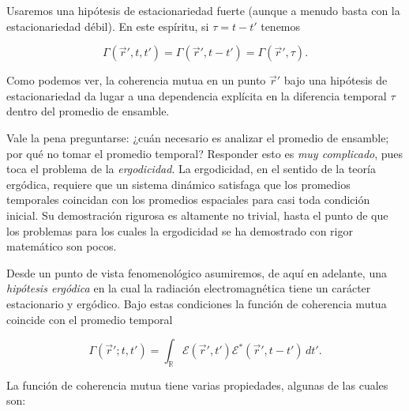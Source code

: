 	Usaremos una hipótesis de estacionariedad fuerte (aunque a menudo basta con la estacionariedad débil). En este espíritu, si $\tau = t-t'$ tenemos

	\begin{equation}
		\Gamma(\vec{r}',t,t') = \Gamma(\vec{r}',t-t') = \Gamma(\vec{r}',\tau).
	\end{equation}

	Como podemos ver, la coherencia mutua en un punto $\vec{r}'$ bajo una hipótesis de estacionariedad da lugar a una dependencia explícita en la diferencia temporal $\tau$ dentro del promedio de ensamble.

	Vale la pena preguntarse: ¿cuán necesario es analizar el promedio de ensamble; por qué no tomar el promedio temporal? Responder esto es \textit{muy complicado}, pues toca el problema de la \textit{ergodicidad}. La ergodicidad, en el sentido de la teoría ergódica, requiere que un sistema dinámico satisfaga que los promedios temporales coincidan con los promedios espaciales para casi toda condición inicial. Su demostración rigurosa es altamente no trivial, hasta el punto de que los problemas para los cuales la ergodicidad se ha demostrado con rigor matemático son pocos.

	Desde un punto de vista fenomenológico asumiremos, de aquí en adelante, una \textit{hipótesis ergódica} en la cual la radiación electromagnética tiene un carácter estacionario y ergódico. Bajo estas condiciones la función de coherencia mutua coincide con el promedio temporal

	\begin{equation}
		\Gamma(\vec{r}';t,t') = \int_{\mathbb{R}} \mathcal{E}(\vec{r}',t') \mathcal{E}^*(\vec{r}',t-t')\,dt'.
	\end{equation}

	La función de coherencia mutua tiene varias propiedades, algunas de las cuales son:

